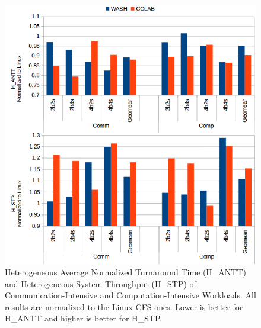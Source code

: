 \begin{figure}
\centering
\includegraphics[scale=0.39]{figures/com.png}
\caption{Heterogeneous Average Normalized Turnaround Time (H\_ANTT) and Heterogeneous System Throughput (H\_STP) of Communication-Intensive and Computation-Intensive Workloads. All results are normalized to the Linux CFS ones. Lower is better for H\_ANTT and higher is better for H\_STP.}
\label{com}
\end{figure} 


